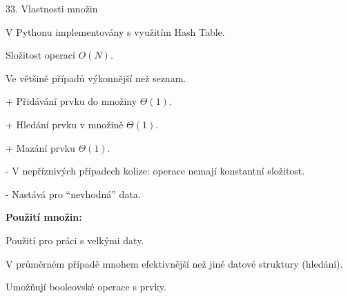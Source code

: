 \documentclass[czech]{beamer}
\begin{document}
\begin{frame}{33. Vlastnosti množin}
 

V Pythonu implementovány s využitím Hash Table.

Složitost operací $O(N)$.

Ve většině případů výkonnější než seznam.\medskip{}

+ Přidávání prvku do množiny $\varTheta(1)$.

+ Hledání prvku v množině $\varTheta(1)$.

+ Mazání prvku $\varTheta(1)$.\bigskip{}

- V nepříznivých případech kolize: operace nemají konstantní složitost.

- Nastává pro ``nevhodná'' data. \bigskip{}

\textbf{Použití množin:}

Použití pro práci s velkými daty.

V průměrném případě mnohem efektivnější než jiné datové struktury
(hledání).

Umožňují booleovské operace s prvky.
\end{frame}
\end{document}
